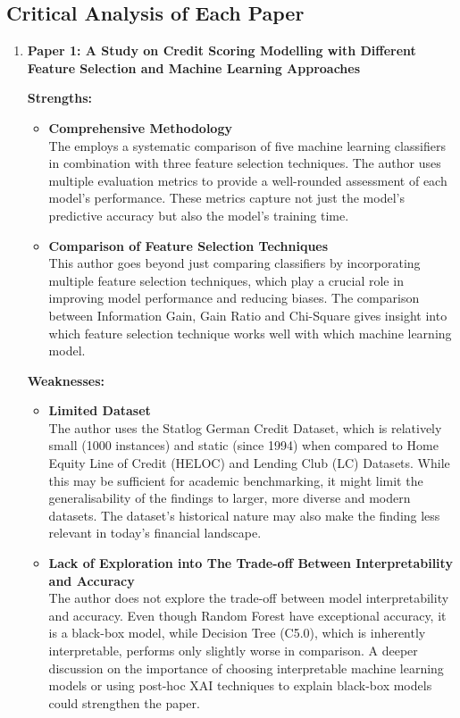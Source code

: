 \documentclass[12pt,a4paper]{article}
\begin{document}
\subsection{Critical Analysis of Each Paper}
\begin{enumerate}
    \item \textbf{Paper 1: A Study on Credit Scoring Modelling with Different Feature Selection and Machine Learning Approaches } 

    \textbf{Strengths:}\\
    \vspace{-2em}
    \begin{itemize}
        \item \textbf{Comprehensive Methodology}\\
        The employs a systematic comparison of five machine learning classifiers in combination with three feature selection techniques. The author uses multiple evaluation metrics to provide a well-rounded assessment of each model’s performance. These metrics capture not just the model’s predictive accuracy but also the model’s training time.
        \item \textbf{Comparison of Feature Selection Techniques}\\
        This author goes beyond just comparing classifiers by incorporating multiple feature selection techniques, which play a crucial role in improving model performance and reducing biases. The comparison between Information Gain, Gain Ratio and Chi-Square gives insight into which feature selection technique works well with which machine learning model.  
    \end{itemize}

    \textbf{Weaknesses:}\\
    \vspace{-2em}
    \begin{itemize}
        \item \textbf{Limited Dataset}\\
        The author uses the Statlog German Credit Dataset, which is relatively small (1000 instances) and static (since 1994) when compared to Home Equity Line of Credit (HELOC) and Lending Club (LC) Datasets. While this may be sufficient for academic benchmarking, it might limit the generalisability of the findings to larger, more diverse and modern datasets. The dataset’s historical nature may also make the finding less relevant in today’s financial landscape.
        \item \textbf{Lack of Exploration into The Trade-off Between Interpretability and Accuracy}\\
        The author does not explore the trade-off between model interpretability and accuracy. Even though Random Forest have exceptional accuracy, it is a black-box model, while Decision Tree (C5.0), which is inherently interpretable, performs only slightly worse in comparison. A deeper discussion on the importance of choosing interpretable machine learning models or using post-hoc XAI techniques to explain black-box models could strengthen the paper.
    \end{itemize}


\end{enumerate}
\end{document}
